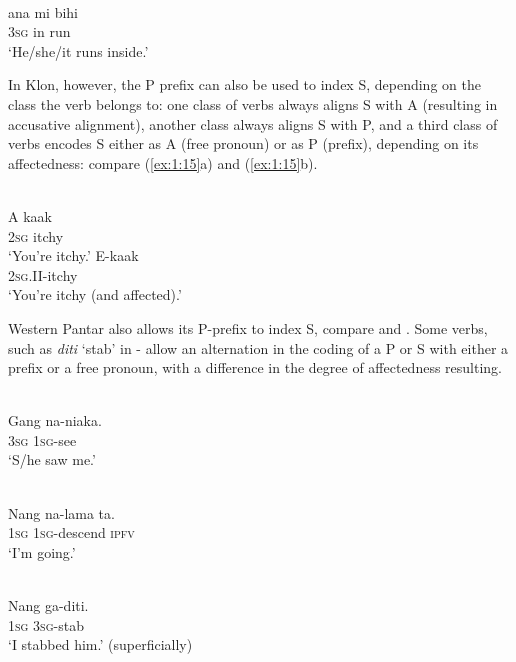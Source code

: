 {\ea%
\label{ex:1:14}
\\
\gll {\textglotstop}ana  mi   bihi  \\
3\textsc{sg}  in  run   \\
\glt `He/she/it runs inside.'
\z







In Klon, however, the P prefix can also be used to index S, depending on the class the verb belongs to: one class of verbs always aligns S with A (resulting in accusative alignment), another class always aligns S with P, and a third class of verbs encodes S either as A (free pronoun) or as P (prefix), depending on its affectedness: compare (\ref{ex:1:15}a) and (\ref{ex:1:15}b).



\ea%
\label{ex:1:15}
 \\
\ea
\gll A  kaak \\
 \textsc{2sg} itchy      \\
\glt `You're itchy.'
\ex
\gll E-kaak \\
  \textsc{2sg.II}{}-itchy   \\
\glt `You're itchy (and affected).' 
\z\z
 


Western Pantar also allows its P-prefix to index S, compare  and .  Some verbs, such as \textit{diti} `stab' in - allow an alternation in the coding of a P or S with either a prefix or a free pronoun, with a difference in the degree of affectedness resulting. 


\ea%
\label{ex:1:16}
 \\
\gll Gang  na-niaka. \\
 3\textsc{sg}  \textsc{1sg}{}-see      \\
\glt `S/he saw me.' 
\z
 

\ea%
\label{ex:1:17}
 \\
\gll  Nang   na-lama   ta.  \\
 1\textsc{sg}   \textsc{1sg}{}-descend   \textsc{ipfv}  \\
\glt `I'm going.'
\z
 

\ea%
\label{ex:1:18}
 \\
\gll Nang    ga-diti. \\
1\textsc{sg}    3\textsc{sg}{}-stab     \\
\glt `I stabbed him.' (superficially)  
\z
 

}
